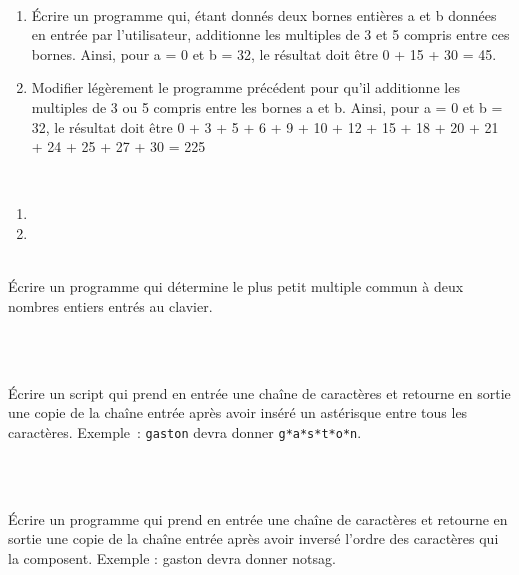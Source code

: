 \documentclass[a4paper,12pt]{article}
\begin{document}
\exo{}  ~\\ 
\begin{enumerate}[label=\alph*)]
	\item Écrire un programme qui, étant donnés deux bornes entières a et b données en entrée par l’utilisateur, additionne les multiples de 3 et 5 compris entre ces bornes. Ainsi, pour a = 0 et b = 32, le résultat doit être 0 + 15 + 30 = 45.
	\item Modifier légèrement le programme précédent pour qu’il additionne les multiples de 3 ou 5 compris entre les bornes a et b. Ainsi, pour a = 0 et b = 32, le résultat doit être 0 + 3 + 5 + 6 + 9 + 10 + 12 + 15 + 18 + 20 + 21 + 24 + 25 + 27 + 30 = 225
\end{enumerate}
\begin{correction}
	~\\ 
	\begin{enumerate}[label=\alph*)]
		\item 
		
		\item  
	\end{enumerate}


\end{correction}
\finexo

\exo{}  ~\\ 
	Écrire un programme qui détermine le plus petit multiple commun à deux nombres entiers entrés au clavier.
	\begin{correction}
		~\\ 
		
	\end{correction}
\finexo


\exo{}  ~\\ 
Écrire un script qui prend en entrée une chaîne de caractères et retourne en sortie une copie de la chaîne entrée après avoir inséré un astérisque entre tous les caractères. 
Exemple : \texttt{gaston} devra donner \texttt{g*a*s*t*o*n}.
\begin{correction}
	~\\ 
	
\end{correction}
\finexo


\exo{}  ~\\ 
Écrire un programme qui prend en entrée une chaîne de caractères et retourne en sortie une copie de la chaîne entrée après avoir inversé l’ordre des caractères qui la composent. 
Exemple : gaston devra donner notsag.
\begin{correction}
	~\\ 
	
\end{correction}
\finexo
\end{document}
